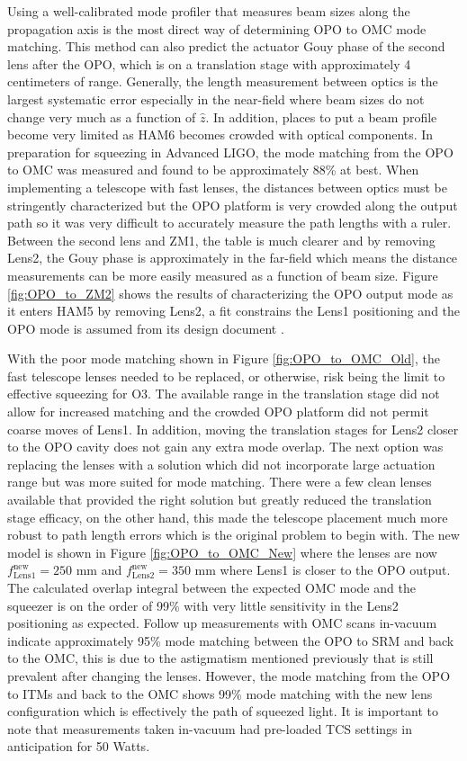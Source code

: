 	Using a well-calibrated mode profiler that measures beam sizes along the propagation axis is the most direct way of determining OPO to OMC mode matching.  This method can also predict the actuator Gouy phase of the second lens after the OPO, which is on a translation stage with approximately 4 centimeters of range. Generally, the length measurement between optics is the largest systematic error especially in the near-field where beam sizes do not change very much as a function of $\hat{z}$.  In addition, places to put a beam profile become very limited as HAM6 becomes crowded with optical components.  In preparation for squeezing in Advanced LIGO, the mode matching from the OPO to OMC was measured and found to be approximately 88\% at best. When implementing a telescope with fast lenses, the distances between optics must be stringently characterized but the OPO platform is very crowded along the output path so it was very difficult to accurately measure the path lengths with a ruler.  Between the second lens and ZM1, the table is much clearer and by removing Lens2, the Gouy phase is approximately in the far-field which means the distance measurements can be more easily measured as a function of beam size.  Figure \ref{fig:OPO_to_ZM2} shows the results of characterizing the OPO output mode as it enters HAM5 by removing Lens2, a fit constrains the Lens1 positioning and the OPO mode is assumed from its design document \cite{Oelker_FD_sqz}.
	
	With the poor mode matching shown in Figure \ref{fig:OPO_to_OMC_Old}, the fast telescope lenses needed to be replaced, or otherwise, risk being the limit to effective squeezing for O3.  The available range in the translation stage did not allow for increased matching and the crowded OPO platform did not permit coarse moves of Lens1. In addition, moving the translation stages for Lens2 closer to the OPO cavity does not gain any extra mode overlap.  The next option was replacing the lenses with a solution which did not incorporate large actuation range but was more suited for mode matching.  There were a few clean lenses available that provided the right solution but greatly reduced the translation stage efficacy, on the other hand, this made the telescope placement much more robust to path length errors which is the original problem to begin with.  The new model is shown in Figure \ref{fig:OPO_to_OMC_New} where the lenses are now  $f^{\text{new}}_{\text{Lens1}} = 250$ mm and $f^{\text{new}}_{\text{Lens2}} = 350$ mm where Lens1 is closer to the OPO output.   The calculated overlap integral between the expected OMC mode and the squeezer is on the order of 99\% with very little sensitivity in the Lens2 positioning as expected.  Follow up measurements with OMC scans in-vacuum indicate approximately 95\% mode matching between the OPO to SRM and back to the OMC, this is due to the astigmatism mentioned previously that is still prevalent after changing the lenses.  However, the mode matching from the OPO to ITMs and back to the OMC shows 99\% mode matching with the new lens configuration \cite{modematch99} which is effectively the path of squeezed light.  It is important to note that measurements taken in-vacuum had pre-loaded TCS settings in anticipation for 50 Watts.
	

